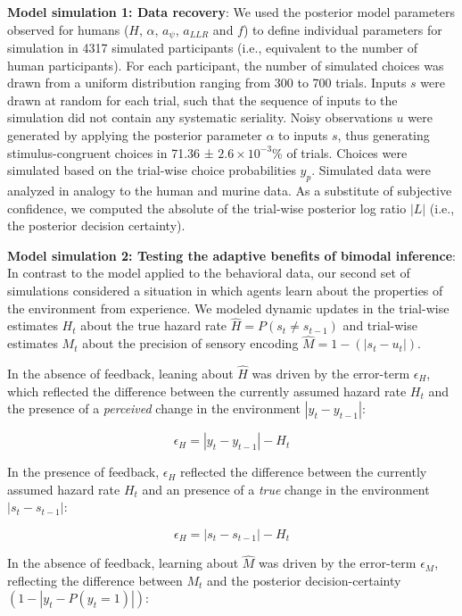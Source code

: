 \documentclass[
]{article}
\begin{document}
\textbf{Model simulation 1: Data recovery}: We used the posterior model
parameters observed for humans (\(H\), \(\alpha\), \(a_{\psi}\),
\(a_{LLR}\) and \(f\)) to define individual parameters for simulation in
4317 simulated participants (i.e., equivalent to the number of human
participants). For each participant, the number of simulated choices was
drawn from a uniform distribution ranging from 300 to 700 trials. Inputs
\(s\) were drawn at random for each trial, such that the sequence of
inputs to the simulation did not contain any systematic seriality. Noisy
observations \(u\) were generated by applying the posterior parameter
\(\alpha\) to inputs \(s\), thus generating stimulus-congruent choices
in 71.36 ± \ensuremath{2.6\times 10^{-3}}\% of trials. Choices were
simulated based on the trial-wise choice probabilities \(y_{p}\).
Simulated data were analyzed in analogy to the human and murine data. As
a substitute of subjective confidence, we computed the absolute of the
trial-wise posterior log ratio \(|L|\) (i.e., the posterior decision
certainty).

\textbf{Model simulation 2: Testing the adaptive benefits of bimodal
inference}: In contrast to the model applied to the behavioral data, our
second set of simulations considered a situation in which agents learn
about the properties of the environment from experience. We modeled
dynamic updates in the trial-wise estimates \(H_t\) about the true
hazard rate \(\hat{H} = P(s_t \neq s_{t-1})\) and trial-wise estimates
\(M_t\) about the precision of sensory encoding
\(\hat{M} = 1 - (|s_t-u_t|)\).

In the absence of feedback, leaning about \(\hat{H}\) was driven by the
error-term \(\epsilon_H\), which reflected the difference between the
currently assumed hazard rate \(H_t\) and the presence of a
\emph{perceived} change in the environment \(|y_t - y_{t-1}|\):

\begin{equation}
\epsilon_H = |y_t - y_{t-1}| - H_t
\end{equation}

In the presence of feedback, \(\epsilon_H\) reflected the difference
between the currently assumed hazard rate \(H_t\) and an presence of a
\emph{true} change in the environment \(|s_t - s_{t-1}|\):

\begin{equation}
\epsilon_H = |s_t - s_{t-1}| - H_t
\end{equation}

In the absence of feedback, learning about \(\hat{M}\) was driven by the
error-term \(\epsilon_M\), reflecting the difference between \(M_t\) and
the posterior decision-certainty \((1-|y_t - P(y_t = 1)|)\):
\end{document}
